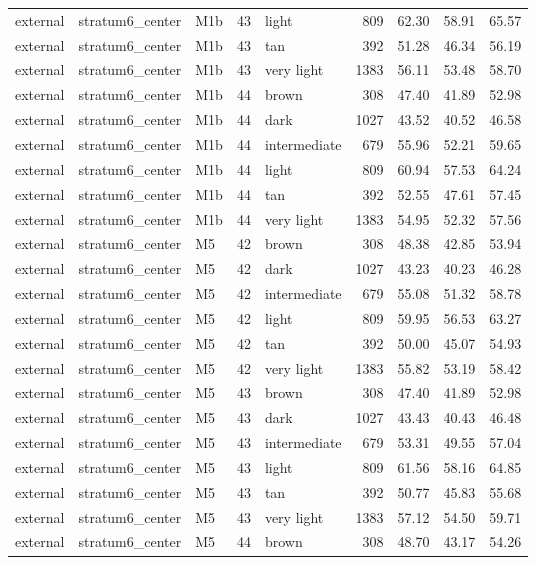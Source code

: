 \begin{tabular}{lllrlrrrr}
external & stratum6\_center & M1b & 43 & light & 809 & 62.30 & 58.91 & 65.57 \\
external & stratum6\_center & M1b & 43 & tan & 392 & 51.28 & 46.34 & 56.19 \\
external & stratum6\_center & M1b & 43 & very light & 1383 & 56.11 & 53.48 & 58.70 \\
external & stratum6\_center & M1b & 44 & brown & 308 & 47.40 & 41.89 & 52.98 \\
external & stratum6\_center & M1b & 44 & dark & 1027 & 43.52 & 40.52 & 46.58 \\
external & stratum6\_center & M1b & 44 & intermediate & 679 & 55.96 & 52.21 & 59.65 \\
external & stratum6\_center & M1b & 44 & light & 809 & 60.94 & 57.53 & 64.24 \\
external & stratum6\_center & M1b & 44 & tan & 392 & 52.55 & 47.61 & 57.45 \\
external & stratum6\_center & M1b & 44 & very light & 1383 & 54.95 & 52.32 & 57.56 \\
external & stratum6\_center & M5 & 42 & brown & 308 & 48.38 & 42.85 & 53.94 \\
external & stratum6\_center & M5 & 42 & dark & 1027 & 43.23 & 40.23 & 46.28 \\
external & stratum6\_center & M5 & 42 & intermediate & 679 & 55.08 & 51.32 & 58.78 \\
external & stratum6\_center & M5 & 42 & light & 809 & 59.95 & 56.53 & 63.27 \\
external & stratum6\_center & M5 & 42 & tan & 392 & 50.00 & 45.07 & 54.93 \\
external & stratum6\_center & M5 & 42 & very light & 1383 & 55.82 & 53.19 & 58.42 \\
external & stratum6\_center & M5 & 43 & brown & 308 & 47.40 & 41.89 & 52.98 \\
external & stratum6\_center & M5 & 43 & dark & 1027 & 43.43 & 40.43 & 46.48 \\
external & stratum6\_center & M5 & 43 & intermediate & 679 & 53.31 & 49.55 & 57.04 \\
external & stratum6\_center & M5 & 43 & light & 809 & 61.56 & 58.16 & 64.85 \\
external & stratum6\_center & M5 & 43 & tan & 392 & 50.77 & 45.83 & 55.68 \\
external & stratum6\_center & M5 & 43 & very light & 1383 & 57.12 & 54.50 & 59.71 \\
external & stratum6\_center & M5 & 44 & brown & 308 & 48.70 & 43.17 & 54.26 \\

\end{tabular}
